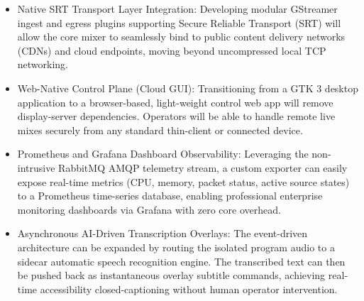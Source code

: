 \documentclass[electronics,article,submit,pdftex,moreauthors]{Definitions/mdpi}
\begin{document}
\begin{itemize}    
    \item Native SRT Transport Layer Integration: Developing modular GStreamer ingest and egress plugins supporting Secure Reliable Transport (SRT) will allow the core mixer to seamlessly bind to public content delivery networks (CDNs) and cloud endpoints, moving beyond uncompressed local TCP networking.    
    \item Web-Native Control Plane (Cloud GUI): Transitioning from a GTK 3 desktop application to a browser-based, light-weight control web app will remove display-server dependencies. Operators will be able to handle remote live mixes securely from any standard thin-client or connected device.    
    \item Prometheus and Grafana Dashboard Observability: Leveraging the non-intrusive RabbitMQ AMQP telemetry stream, a custom exporter can easily expose real-time metrics (CPU, memory, packet status, active source states) to a Prometheus time-series database, enabling professional enterprise monitoring dashboards via Grafana with zero core overhead.    
    \item Asynchronous AI-Driven Transcription Overlays: The event-driven architecture can be expanded by routing the isolated program audio to a sidecar automatic speech recognition engine. The transcribed text can then be pushed back as instantaneous overlay subtitle commands, achieving real-time accessibility closed-captioning without human operator intervention.
\end{itemize}

\vspace{6pt}


\end{document}
